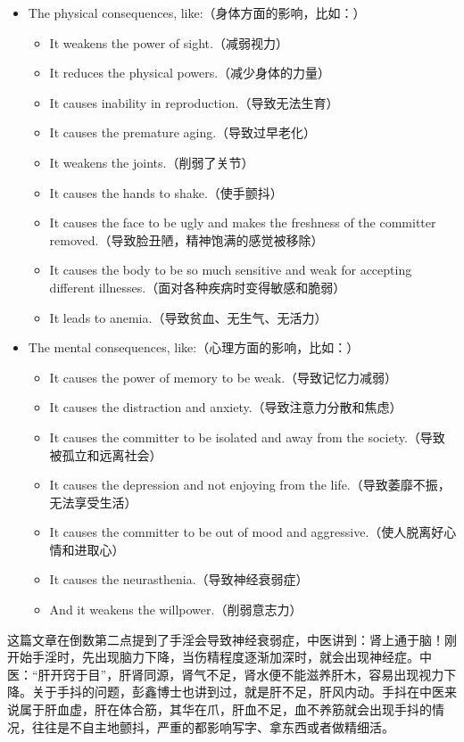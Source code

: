\begin{itemize}
    \item The physical consequences, like:（身体方面的影响，比如：）\begin{itemize}
        \item It weakens the power of sight.（减弱视力）
        \item It reduces the physical powers.（减少身体的力量）
        \item It causes inability in reproduction.（导致无法生育）
        \item It causes the premature aging.（导致过早老化）
        \item It weakens the joints.（削弱了关节）
        \item It causes the hands to shake.（使手颤抖）
        \item It causes the face to be ugly and makes the freshness of the committer removed.（导致脸丑陋，精神饱满的感觉被移除）
        \item It causes the body to be so much sensitive and weak for accepting different illnesses.（面对各种疾病时变得敏感和脆弱）
        \item It leads to anemia.（导致贫血、无生气、无活力）
    \end{itemize}
    \item The mental consequences, like:（心理方面的影响，比如：）\begin{itemize}
        \item It causes the power of memory to be weak.（导致记忆力减弱）
        \item It causes the distraction and anxiety.（导致注意力分散和焦虑）
        \item It causes the committer to be isolated and away from the society.（导致被孤立和远离社会）
        \item It causes the depression and not enjoying from the life.（导致萎靡不振，无法享受生活）
        \item It causes the committer to be out of mood and aggressive.（使人脱离好心情和进取心）
        \item It causes the neurasthenia.（导致神经衰弱症）
        \item And it weakens the willpower.（削弱意志力）
    \end{itemize}
\end{itemize}

这篇文章在倒数第二点提到了手淫会导致神经衰弱症，中医讲到：肾上通于脑！刚开始手淫时，先出现脑力下降，当伤精程度逐渐加深时，就会出现神经症。中医：“肝开窍于目”，肝肾同源，肾气不足，肾水便不能滋养肝木，容易出现视力下降。关于手抖的问题，彭鑫博士也讲到过，就是肝不足，肝风内动。手抖在中医来说属于肝血虚，肝在体合筋，其华在爪，肝血不足，血不养筋就会出现手抖的情况，往往是不自主地颤抖，严重的都影响写字、拿东西或者做精细活。


